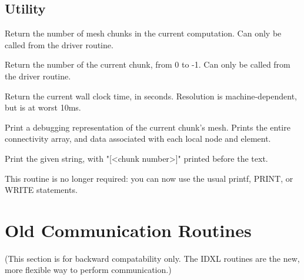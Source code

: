 \documentclass[10pt]{article}
\begin{document}
\subsection{Utility}


     Return the number of mesh chunks in the current computation.  Can
     only be called from the driver routine.


     Return the number of the current chunk, from 0 to
     -1.  Can only be called from the driver routine.


     Return the current wall clock time, in seconds.  Resolution is
     machine-dependent, but is at worst 10ms.


     Print a debugging representation of the current chunk's mesh.
     Prints the entire connectivity array, and data associated with
     each local node and element.


     Print the given string, with "[<chunk number>]" printed 
     before the text.  

     This routine is no longer required: you can now use 
     the usual printf, PRINT, or WRITE statements.






\section{Old Communication Routines}

(This section is for backward compatability only.  The IDXL routines
are the new, more flexible way to perform communication.)
\end{document}
